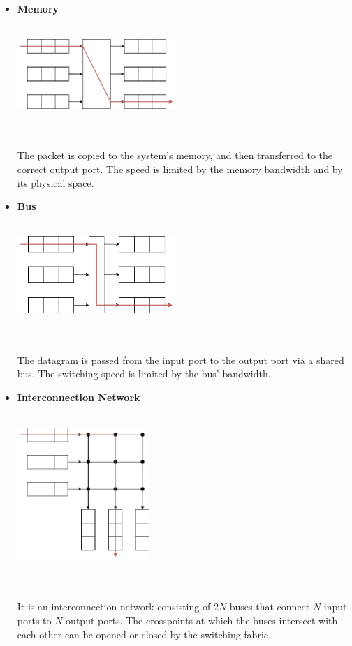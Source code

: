 \documentclass{article}
\begin{document}
\begin{itemize}
	\item \textbf{Memory}
	\vspace{.2cm} \\ \\
	\centerline{\includegraphics[width=6cm]{./assets/memory.png}} \\ \\
	The packet is copied to the system's memory, and then transferred to the correct output port. The speed is limited by the memory bandwidth and by its physical space.
	
	\item \textbf{Bus}
	\vspace{.2cm} \\ \\
	\centerline{\includegraphics[width=6cm]{./assets/bus.png}} \\ \\
	The datagram is passed from the input port to the output port via a shared bus. The switching speed is limited by the bus' bandwidth.
	
	\item \textbf{Interconnection Network}
	\vspace{.2cm} \\ \\
	\centerline{\includegraphics[width=5cm]{./assets/interconnection.png}} \\ \\
	It is an interconnection network consisting of $2N$ buses that connect $N$ input ports to $N$ output ports. The crosspoints at which the buses intersect with each other can be opened or closed by the switching fabric.
\end{itemize}
\end{document}
